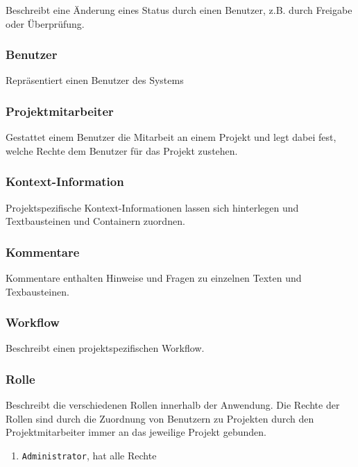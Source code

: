 Beschreibt eine Änderung eines Status durch einen Benutzer, z.B. durch Freigabe oder Überprüfung.

\subsubsection{Benutzer}\label{model:benutzer}

Repräsentiert einen Benutzer des Systems

\subsubsection{Projektmitarbeiter}\label{model:projektmitarbeiter}

Gestattet einem Benutzer die Mitarbeit an einem Projekt und legt dabei fest, welche Rechte dem Benutzer für das Projekt zustehen.

\subsubsection{Kontext-Information}\label{model:contextinfo}

Projektspezifische Kontext-Informationen lassen sich hinterlegen und Textbausteinen und Containern zuordnen.

\subsubsection{Kommentare}\label{model:notizen}

Kommentare enthalten Hinweise und Fragen zu einzelnen Texten und Texbausteinen.

\subsubsection{Workflow}\label{model:workflow}

Beschreibt einen projektspezifischen Workflow.



\subsubsection{Rolle}\label{model:rolle}

Beschreibt die verschiedenen Rollen innerhalb der Anwendung. Die Rechte der Rollen sind durch die Zuordnung von Benutzern zu Projekten durch den Projektmitarbeiter immer an das jeweilige Projekt gebunden.

\begin{enumerate}\itemsep -5pt
\item \texttt{Administrator}, hat alle Rechte 
\end{enumerate}

